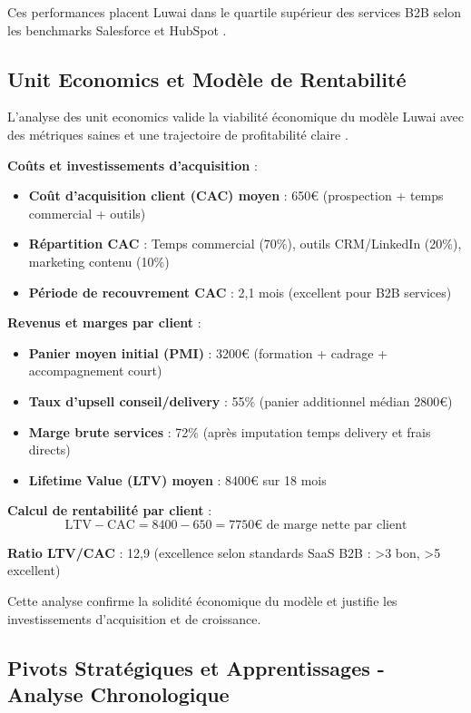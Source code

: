 Ces performances placent Luwai dans le quartile supérieur des services B2B selon les benchmarks Salesforce et HubSpot \cite{hubspot2024sales}.

\subsection{Unit Economics et Modèle de Rentabilité}

L'analyse des unit economics valide la viabilité économique du modèle Luwai avec des métriques saines et une trajectoire de profitabilité claire \cite{luwai2025economics}.

\textbf{Coûts et investissements d'acquisition} :
\begin{itemize}
    \item \textbf{Coût d'acquisition client (CAC) moyen} : 650€ (prospection + temps commercial + outils)
    \item \textbf{Répartition CAC} : Temps commercial (70\%), outils CRM/LinkedIn (20\%), marketing contenu (10\%)
    \item \textbf{Période de recouvrement CAC} : 2,1 mois (excellent pour B2B services)
\end{itemize}

\textbf{Revenus et marges par client} :
\begin{itemize}
    \item \textbf{Panier moyen initial (PMI)} : 3200€ (formation + cadrage + accompagnement court)
    \item \textbf{Taux d'upsell conseil/delivery} : 55\% (panier additionnel médian 2800€)
    \item \textbf{Marge brute services} : 72\% (après imputation temps delivery et frais directs)
    \item \textbf{Lifetime Value (LTV) moyen} : 8400€ sur 18 mois
\end{itemize}

\textbf{Calcul de rentabilité par client} :
\[
\text{LTV} - \text{CAC} = 8400 - 650 = 7750\text{€ de marge nette par client}
\]

\textbf{Ratio LTV/CAC} : 12,9 (excellence selon standards SaaS B2B : >3 bon, >5 excellent)

Cette analyse confirme la solidité économique du modèle et justifie les investissements d'acquisition et de croissance.

\subsection{Pivots Stratégiques et Apprentissages - Analyse Chronologique}

